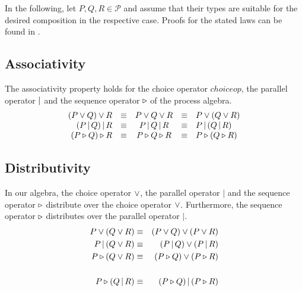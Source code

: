 In the following, let $P, Q, R \in \mathcal{P}$ and assume that their types are suitable for the desired composition in the respective case. Proofs for the stated laws can be found in .

\subsection{Associativity}
The associativity property holds for the choice operator $choiceop$, the parallel operator $|$ and the sequence operator $\triangleright$ of the process algebra.
\begin{equation*}
\begin{array}{rcccl}
  \left( P \vee Q \right) \vee R & \equiv & P \vee Q \vee R & \equiv & P \vee \left( Q \vee R \right) \\
  \left( P \,|\, Q \right) |\, R & \equiv & P \,|\, Q \,|\, R & \equiv & P \,| \left( Q \,|\, R \right) \\
  \left( P \triangleright Q \right) \triangleright R & \equiv & P \triangleright Q \triangleright R & \equiv & P \triangleright \left( Q \triangleright R \right)
\end{array}
\end{equation*}

\subsection{Distributivity}
In our algebra, the choice operator $\vee$, the parallel operator $|$ and the sequence operator $\triangleright$ distribute over the choice operator $\vee$. Furthermore, the sequence operator $\triangleright$ distributes over the parallel operator $|$.
\begin{eqnarray*}
  P \vee \left( Q \vee R \right) & \equiv & \left( P \vee Q \right) \vee \left( P \vee R \right) \\
  P \,| \left( Q \vee R \right) & \equiv & \left( P \,|\, Q \right) \vee \left( P \,|\, R \right) \\
  P \triangleright \left( Q \vee R \right) & \equiv & \left( P \triangleright Q \right) \vee \left( P \triangleright R \right) \\
  & & \\
  P \triangleright \left( Q \,|\, R \right) & \equiv & \left( P \triangleright Q \right) | \left( P \triangleright R \right)
\end{eqnarray*}

